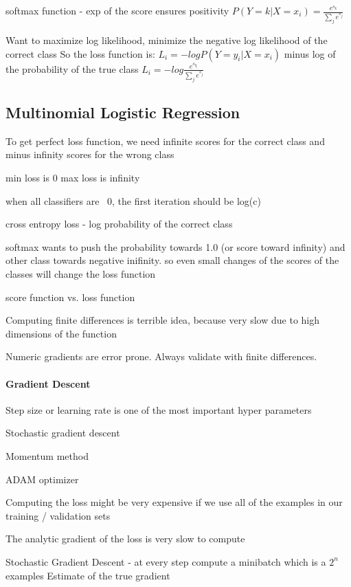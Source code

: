 softmax function - exp of the score ensures positivity
$ P(Y=k|X=x_i) = \frac{e^{s_k}}{\sum_j e^{s_j}} $

Want to maximize log likelihood, minimize the negative log likelihood of the correct class
So the loss function is:
$ L_i = - log P(Y=y_i|X=x_i) $
minus log of the probability of the true class
$ L_i = - log \frac{e^{s_{y_i}}}{\sum_j e^{s_j}} $

\subsection{Multinomial Logistic Regression}

To get perfect loss function, we need infinite scores for the correct class and minus infinity scores for the wrong class

min loss is 0 
max loss is infinity

when all classifiers are ~0, the first iteration should be log(c)

cross entropy loss
- log probability of the correct class

softmax wants to push the probability towards 1.0 (or score toward infinity) and other class towards negative inifinity. so even small changes of the scores of the classes will change the loss function

score function vs. loss function

Computing finite differences is terrible idea, because very slow due to high dimensions of the function

Numeric gradients are error prone.
Always validate with finite differences. 

\paragraph{Gradient Descent}

Step size or learning rate is one of the most important hyper parameters

Stochastic gradient descent

Momentum method

ADAM optimizer

Computing the loss might be very expensive if we use all of the examples in our training / validation sets

The analytic gradient of the loss is very slow to compute

Stochastic Gradient Descent - at every step compute a minibatch which is a $2^n$ examples
Estimate of the true gradient

